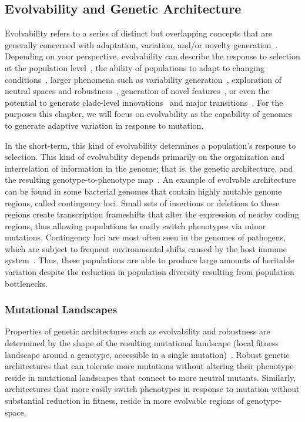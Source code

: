 \documentclass[10pt,letterpaper]{article}
\begin{document}
\subsection*{Evolvability and Genetic Architecture}
Evolvability refers to a series of distinct but overlapping concepts that are generally concerned with adaptation, variation, and/or novelty generation~\cite{pigliucci_is_2008}. Depending on your perspective, evolvability can describe the response to selection at the population level~\cite{fisher_genetical_1930,houle_comparing_1992}, the ability of populations to adapt to changing conditions~\cite{belle_code_2002}, larger phenomena such as variability generation~\cite{gunter_p._wagner_perspective:_1996}, 
exploration of neutral spaces and robustness~\cite{andreas_wagner_robustness_2005,kitano_biological_2004}, 
generation of novel features~\cite{alberch_genes_1991,brookfield_evolution:_2001}, 
or even the potential to generate clade-level innovations~\cite{kirschner_evolvability_1998} 
and major transitions~\cite{smith_major_1995}. For the purposes this chapter, we will focus on evolvability as the capability of genomes to generate adaptive variation in response to mutation. 

In the short-term, this kind of evolvability determines a population's response to selection. This kind of evolvability depends primarily on the organization and interrelation of information in the genome; that is, the genetic architecture, and the resulting genotype-to-phenotype map~\cite{gunter_p._wagner_perspective:_1996}. An example of evolvable architecture can be found in some bacterial genomes that contain highly mutable genome regions, called contingency loci. Small sets of insertions or deletions to these regions create transcription frameshifts that alter the expression of nearby coding regions, thus allowing populations to easily switch phenotypes via minor mutations. Contingency loci are most often seen in the genomes of pathogens, which are subject to frequent environmental shifts caused by the host immune system~\cite{bayliss_simple_2001}. Thus, these populations are able to produce large amounts of heritable variation despite the reduction in population diversity resulting from population bottlenecks.


\subsubsection*{Mutational Landscapes}
Properties of genetic architectures such as evolvability and robustness are determined by the shape of the resulting mutational landscape (local fitness landscape around a genotype, accessible in a single mutation)~\cite{andreas_wagner_robustness_2008}. Robust genetic architectures that can tolerate more mutations without altering their phenotype reside in mutational landscapes that connect to more neutral mutants. Similarly, architectures that more easily switch phenotypes in response to mutation without substantial reduction in fitness, reside in more evolvable regions of genotype-space.
\end{document}
